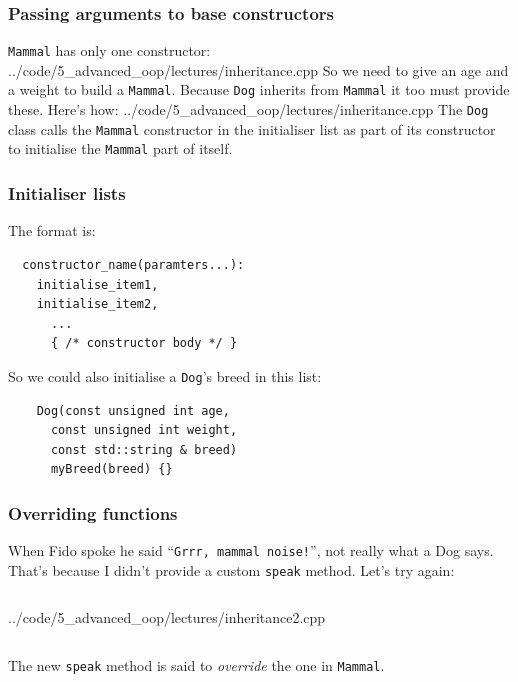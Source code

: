 \documentclass[handout]{beamer}
\begin{document}
\begin{frame}[fragile]
  \frametitle{Passing arguments to base constructors}
  
  \texttt{Mammal} has only one constructor:
  	{../code/5_advanced_oop/lectures/inheritance.cpp}
  So we need to give an age and a weight to build a \texttt{Mammal}.  Because \texttt{Dog} inherits from \texttt{Mammal} it too must provide these.\pause{} Here's how:
  	{../code/5_advanced_oop/lectures/inheritance.cpp}  
	The \texttt{Dog} class calls the \texttt{Mammal} constructor in the initialiser list as part of its constructor to initialise the \texttt{Mammal} part of itself.

\end{frame}

\begin{frame}[fragile]
  \frametitle{Initialiser lists}
  
	
	The format is:
	\begin{lstlisting}
  constructor_name(paramters...):
    initialise_item1,
    initialise_item2,
	  ...
	  { /* constructor body */ }
	\end{lstlisting}
	So we could also initialise a \texttt{Dog}'s breed in this list:
	\begin{lstlisting}
	Dog(const unsigned int age,
	  const unsigned int weight,
	  const std::string & breed)
	  myBreed(breed) {}
	\end{lstlisting}
\end{frame}

\begin{frame}[fragile]
  \frametitle{Overriding functions}
  
  When Fido spoke he said ``\texttt{Grrr, mammal noise!}'', not really what a Dog says.  That's because I didn't provide a custom \texttt{speak} method.  Let's try again:\pause
  \begin{columns}[t]
    \begin{column}[T]{0.55\linewidth}
  			{../code/5_advanced_oop/lectures/inheritance2.cpp}  
  	\end{column}
  	\begin{column}[T]{0.4\linewidth}
  	\end{column}
  \end{columns}
  \pause
  The new \texttt{speak} method is said to \textit{override} the one in \texttt{Mammal}.

\end{frame}
\end{document}
